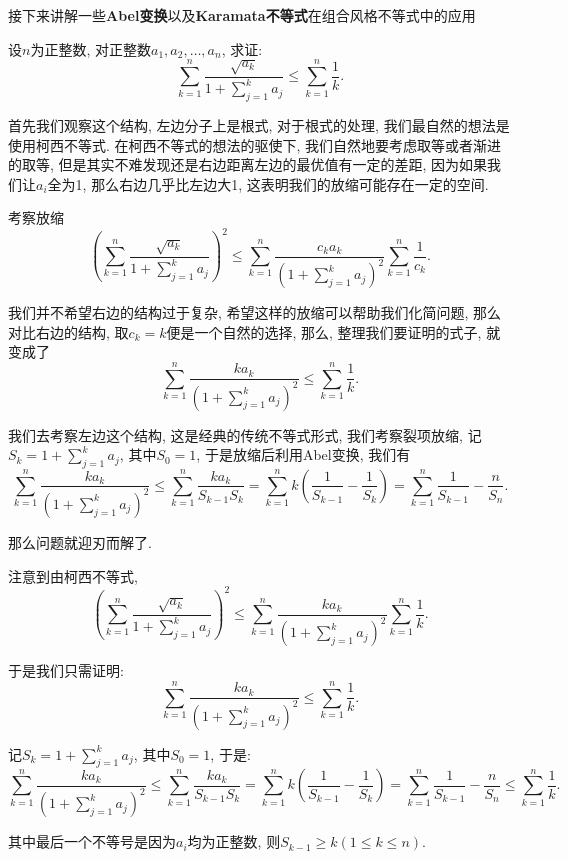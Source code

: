 \documentclass[lang=cn,12pt,thmcnt=section]{elegantbook}
\begin{document}
接下来讲解一些\textbf{Abel变换}以及\textbf{Karamata不等式}在组合风格不等式中的应用

\begin{example}
设$n$为正整数, 对正整数$a_1,a_2,\dots{},a_n$, 求证: 
\[
\sum_{k=1}^n \frac{\sqrt{a_k}}{1+\sum_{j=1}^k a_j}\le \sum_{k=1}^n \frac{1}{k}.
\]
\end{example}

\begin{analysis}
首先我们观察这个结构, 左边分子上是根式, 对于根式的处理, 我们最自然的想法是使用柯西不等式. 在柯西不等式的想法的驱使下, 我们自然地要考虑取等或者渐进的取等, 但是其实不难发现还是右边距离左边的最优值有一定的差距, 因为如果我们让$a_i$全为1, 那么右边几乎比左边大1, 这表明我们的放缩可能存在一定的空间.

考察放缩
\[
\left(\sum_{k=1}^n \frac{\sqrt{a_k}}{1+\sum_{j=1}^k a_j}\right)^2\le \sum_{k=1}^n \frac{{c_ka_k}}{\left(1+\sum_{j=1}^k a_j\right)^2}\sum_{k=1}^n \frac{1}{{c_k}}.
\]

我们并不希望右边的结构过于复杂, 希望这样的放缩可以帮助我们化简问题, 那么对比右边的结构, 取$c_k=k$便是一个自然的选择, 那么, 整理我们要证明的式子, 就变成了
\[
\sum_{k=1}^n \frac{{ka_k}}{\left(1+\sum_{j=1}^k a_j\right)^2}\le \sum_{k=1}^n \frac{1}{k}.
\]

我们去考察左边这个结构, 这是经典的传统不等式形式, 我们考察裂项放缩, 记$S_k=1+\sum_{j=1}^k a_j$, 其中$S_0=1$, 于是放缩后利用Abel变换, 我们有
\[
\sum_{k=1}^n \frac{{ka_k}}{\left(1+\sum_{j=1}^k a_j\right)^2}\le \sum_{k=1}^n \frac{{ka_k}}{S_{k-1}S_k}=\sum_{k=1}^n k\left(\frac{1}{S_{k-1}}-\frac{1}{S_k}\right)=\sum_{k=1}^n \frac{1}{S_{k-1}}-\frac{n}{S_n}
.\]

那么问题就迎刃而解了.
\end{analysis}

\begin{solution}
注意到由柯西不等式, 
\[
\left(\sum_{k=1}^n \frac{\sqrt{a_k}}{1+\sum_{j=1}^k a_j}\right)^2\le \sum_{k=1}^n \frac{{ka_k}}{\left(1+\sum_{j=1}^k a_j\right)^2}\sum_{k=1}^n \frac{1}{{k}}
.\]

于是我们只需证明: 
\[
\sum_{k=1}^n \frac{{ka_k}}{\left(1+\sum_{j=1}^k a_j\right)^2}\le \sum_{k=1}^n \frac{1}{k}
.\]

记$S_k=1+\sum_{j=1}^k a_j$, 其中$S_0=1$, 于是: 
\[
\sum_{k=1}^n \frac{{ka_k}}{\left(1+\sum_{j=1}^k a_j\right)^2}\le \sum_{k=1}^n \frac{{ka_k}}{S_{k-1}S_k}=\sum_{k=1}^n k\left(\frac{1}{S_{k-1}}-\frac{1}{S_k}\right)=\sum_{k=1}^n \frac{1}{S_{k-1}}-\frac{n}{S_n}\le \sum_{k=1}^n \frac{1}{k}
.\]

其中最后一个不等号是因为$a_i$均为正整数, 则$S_{k-1}\ge k(1\le k\le n)$.
\end{solution}
\end{document}

